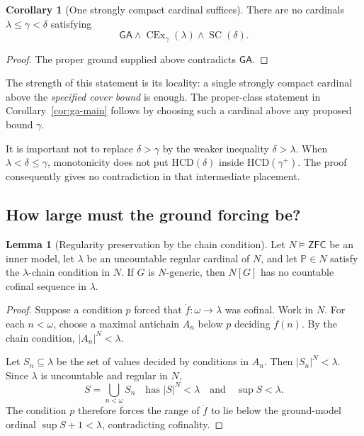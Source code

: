 \documentclass[11pt,letterpaper]{article}
\theoremstyle{definition}
\newtheorem{lemma}[definition]{Lemma}
\newtheorem{corollary}[definition]{Corollary}
\newcommand{\ZFC}{\mathsf{ZFC}}
\newcommand{\SC}{\operatorname{SC}}
\newcommand{\CEx}{\operatorname{CEx}}
\newcommand{\HCD}{\mathrm{HCD}}
\newcommand{\GA}{\mathsf{GA}}
\begin{document}
\begin{corollary}[One strongly compact cardinal suffices]\label{cor:one-sc}
There are no cardinals $\lambda\le\gamma<\delta$ satisfying
\[
\GA\wedge\CEx_\gamma(\lambda)\wedge\SC(\delta).
\]
\end{corollary}
\begin{proof}
The proper ground supplied above contradicts $\GA$.
\end{proof}

The strength of this statement is its locality: a single strongly compact cardinal above the \emph{specified cover bound} is enough. The proper-class statement in Corollary~\ref{cor:ga-main} follows by choosing such a cardinal above any proposed bound $\gamma$.

It is important not to replace $\delta>\gamma$ by the weaker inequality $\delta>\lambda$. When $\lambda<\delta\le\gamma$, monotonicity does not put $\HCD(\delta)$ inside $\HCD(\gamma^+)$. The proof consequently gives no contradiction in that intermediate placement.

\subsection{How large must the ground forcing be?}

\begin{lemma}[Regularity preservation by the chain condition]\label{lem:forcing-cc}
Let $N\models\ZFC$ be an inner model, let $\lambda$ be an uncountable regular cardinal of $N$, and let $\mathbb P\in N$ satisfy the $\lambda$-chain condition in $N$. If $G$ is $N$-generic, then $N[G]$ has no countable cofinal sequence in $\lambda$.
\end{lemma}
\begin{proof}
Suppose a condition $p$ forced that $\dot f:\omega\to\lambda$ was cofinal. Work in $N$. For each $n<\omega$, choose a maximal antichain $A_n$ below $p$ deciding $\dot f(n)$. By the chain condition, $|A_n|^N<\lambda$.

Let $S_n\subseteq\lambda$ be the set of values decided by conditions in $A_n$. Then $|S_n|^N<\lambda$. Since $\lambda$ is uncountable and regular in $N$,
\[
S=\bigcup_{n<\omega}S_n
\quad\text{has }|S|^N<\lambda
\quad\text{and}\quad\sup S<\lambda.
\]
The condition $p$ therefore forces the range of $\dot f$ to lie below the ground-model ordinal $\sup S+1<\lambda$, contradicting cofinality.
\end{proof}
\end{document}
